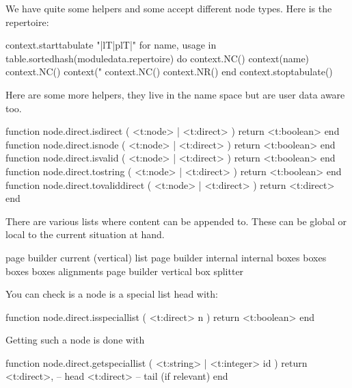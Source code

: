 We have quite some helpers and some accept different node types. Here is the
repertoire:

\startluacode
    context.starttabulate { "|lT|plT|" }
    for name, usage in table.sortedhash(moduledata.repertoire) do
        context.NC() context(name)
        context.NC() context("%
        context.NC() context.NR()
    end
    context.stoptabulate()
\stopluacode

Here are some more helpers, they live in the  name space but are
user data aware too.

\starttyping[option=LUA]
function node.direct.isdirect       ( <t:node> | <t:direct> ) return <t:boolean> end
function node.direct.isnode         ( <t:node> | <t:direct> ) return <t:boolean> end
function node.direct.isvalid        ( <t:node> | <t:direct> ) return <t:boolean> end
function node.direct.tostring       ( <t:node> | <t:direct> ) return <t:boolean> end
function node.direct.tovaliddirect  ( <t:node> | <t:direct> ) return <t:direct> end
\stoptyping

\stopsubsection

\startsubsection[title={Special lists}]

There are various lists where content can be appended to. These can be global or
local to the current situation at hand.

\startcolumns[n=2]
\starttabulate
\NC {}    \NC page builder \NC \NR
\NC {}    \NC current (vertical) list \NC \NR
\NC {}          \NC page builder \NC \NR
\NC {}          \NC internal \NC \NR
\NC {}          \NC internal \NC \NR
\NC {}    \NC boxes \NC \NR
\NC {}     \NC boxes \NC \NR
\NC {}   \NC boxes \NC \NR
\NC {}    \NC boxes \NC \NR
\NC {}         \NC alignments \NC \NR
\NC {}  \NC page builder \NC \NR
\NC {} \NC vertical box splitter \NC \NR
\stoptabulate
\stopcolumns

You can check is a node is a special list head with:

\starttyping[option=LUA]
function node.direct.isspeciallist (
    <t:direct> n
)
    return <t:boolean>
end
\stoptyping

Getting such a node is done with

\starttyping[option=LUA]
function node.direct.getspeciallist (
    <t:string> | <t:integer> id
)
    return
        <t:direct>, -- head
        <t:direct>  -- tail (if relevant)
end
\stoptyping

